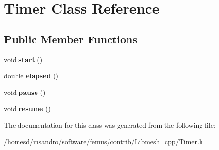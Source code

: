 \hypertarget{class_timer}{\section{Timer Class Reference}
\label{class_timer}
}
\subsection*{Public Member Functions}
\begin{DoxyCompactItemize}
\item 
\hypertarget{class_timer_a3a8b5272198d029779dc9302a54305a8}{void {\bfseries start} ()}\label{class_timer_a3a8b5272198d029779dc9302a54305a8}

\item 
\hypertarget{class_timer_a7a0f15257db9fa349a43042d3d28349b}{double {\bfseries elapsed} ()}\label{class_timer_a7a0f15257db9fa349a43042d3d28349b}

\item 
\hypertarget{class_timer_a0289effad7b573c508bc27e405900a23}{void {\bfseries pause} ()}\label{class_timer_a0289effad7b573c508bc27e405900a23}

\item 
\hypertarget{class_timer_a4ac55a73bb3431db9d4d2fd70ae9a2e8}{void {\bfseries resume} ()}\label{class_timer_a4ac55a73bb3431db9d4d2fd70ae9a2e8}

\end{DoxyCompactItemize}


The documentation for this class was generated from the following file\-:\begin{DoxyCompactItemize}
\item 
/homesd/msandro/software/femus/contrib/\-Libmesh\-\_\-cpp/Timer.\-h\end{DoxyCompactItemize}
